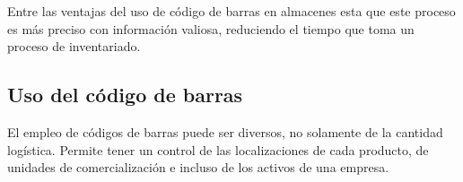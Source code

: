 Entre las ventajas del uso de código de barras en almacenes esta que este proceso es más preciso con información valiosa, reduciendo el tiempo que toma un proceso de inventariado.

\subsection{Uso del código de barras}

El empleo de códigos de barras puede ser diversos, no solamente de la cantidad logística. Permite tener un control de las localizaciones de cada producto, de unidades de comercialización e incluso de los activos de una empresa.\\

